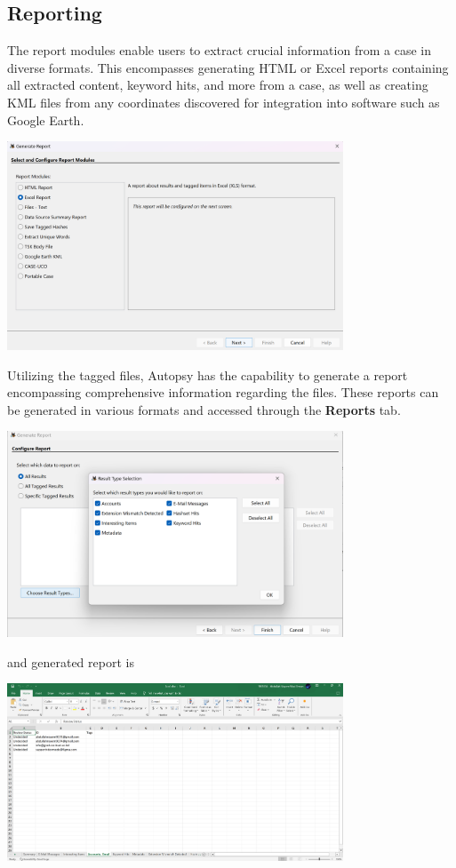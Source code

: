 \documentclass{extarticle}
\begin{document}
\subsection{Reporting}
The report modules enable users to extract crucial information from a case in diverse formats. This encompasses generating HTML or Excel reports containing all extracted content, keyword hits, and more from a case, as well as creating KML files from any coordinates discovered for integration into software such as Google Earth.

\begin{center}
    \includegraphics[width=0.75\textwidth]{5/5.3/Report Generation-1 .png}
\end{center}

Utilizing the tagged files, Autopsy has the capability to generate a report encompassing comprehensive information regarding the files. These reports can be generated in various formats and accessed through the \textbf{Reports} tab.

\begin{center}
    \includegraphics[width=0.75\textwidth]{5/5.3/Report Generation-2 .png}
\end{center}
and generated report is 
\begin{center}
    \includegraphics[width=0.75\textwidth]{5/5.3/Report Generation-3.png}
\end{center}
\end{document}
